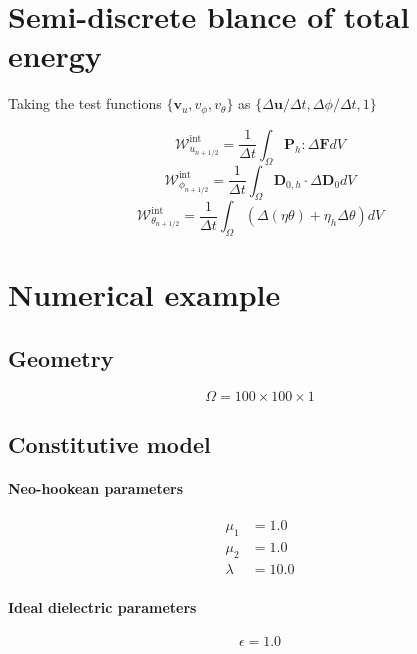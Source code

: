 \documentclass[a4paper,12pt]{article}
\newcommand{\D}{\mathbf{D}}
\newcommand{\F}{\mathbf{F}}
\renewcommand{\P}{\mathbf{P}}  %
\newcommand{\0}{\mathbf{0}}
\begin{document}
\section{Semi-discrete blance of total energy}

Taking the test functions $\{\mathbf{v}_u, v_\phi, v_\theta \}$ as $\{\Delta\mathbf{u}/\Delta t, \Delta\phi/\Delta t, 1\}$

\begin{equation*}
    \mathcal{W}_{u_{n+1/2}}^\text{int} = \frac{1}{\Delta t}\int_\Omega \P_h:\Delta\F dV
\end{equation*}
\begin{equation*}
    \mathcal{W}_{\phi_{n+1/2}}^\text{int} = \frac{1}{\Delta t}\int_\Omega \D_{0,h}\cdot\Delta\D_0 dV
\end{equation*}
\begin{equation*}
    \mathcal{W}_{\theta_{n+1/2}}^\text{int} = \frac{1}{\Delta t}\int_\Omega (\Delta(\eta\theta) + \eta_h\Delta\theta) dV
\end{equation*}





\section{Numerical example}

\subsection{Geometry}

$$
\Omega = 100 \times 100 \times 1
$$


\subsection{Constitutive model}

\paragraph{Neo-hookean parameters}
\begin{align*}
\mu_1   &= 1.0 \\
\mu_2   &= 1.0 \\
\lambda &= 10.0
\end{align*}

\paragraph{Ideal dielectric parameters}
\begin{equation*}
\epsilon = 1.0 
\end{equation*}
\end{document}
